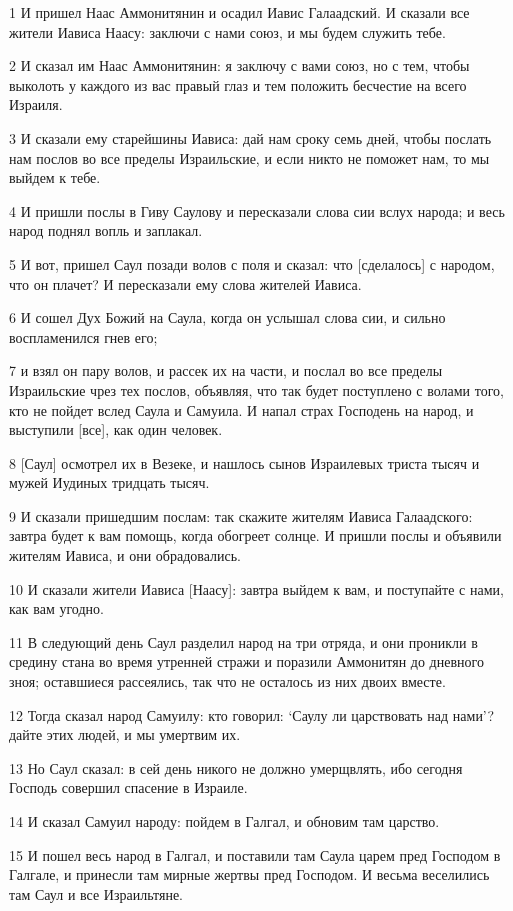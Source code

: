 \par 1 И пришел Наас Аммонитянин и осадил Иавис Галаадский. И сказали все жители Иависа Наасу: заключи с нами союз, и мы будем служить тебе.
\par 2 И сказал им Наас Аммонитянин: я заключу с вами союз, но с тем, чтобы выколоть у каждого из вас правый глаз и тем положить бесчестие на всего Израиля.
\par 3 И сказали ему старейшины Иависа: дай нам сроку семь дней, чтобы послать нам послов во все пределы Израильские, и если никто не поможет нам, то мы выйдем к тебе.
\par 4 И пришли послы в Гиву Саулову и пересказали слова сии вслух народа; и весь народ поднял вопль и заплакал.
\par 5 И вот, пришел Саул позади волов с поля и сказал: что [сделалось] с народом, что он плачет? И пересказали ему слова жителей Иависа.
\par 6 И сошел Дух Божий на Саула, когда он услышал слова сии, и сильно воспламенился гнев его;
\par 7 и взял он пару волов, и рассек их на части, и послал во все пределы Израильские чрез тех послов, объявляя, что так будет поступлено с волами того, кто не пойдет вслед Саула и Самуила. И напал страх Господень на народ, и выступили [все], как один человек.
\par 8 [Саул] осмотрел их в Везеке, и нашлось сынов Израилевых триста тысяч и мужей Иудиных тридцать тысяч.
\par 9 И сказали пришедшим послам: так скажите жителям Иависа Галаадского: завтра будет к вам помощь, когда обогреет солнце. И пришли послы и объявили жителям Иависа, и они обрадовались.
\par 10 И сказали жители Иависа [Наасу]: завтра выйдем к вам, и поступайте с нами, как вам угодно.
\par 11 В следующий день Саул разделил народ на три отряда, и они проникли в средину стана во время утренней стражи и поразили Аммонитян до дневного зноя; оставшиеся рассеялись, так что не осталось из них двоих вместе.
\par 12 Тогда сказал народ Самуилу: кто говорил: `Саулу ли царствовать над нами'? дайте этих людей, и мы умертвим их.
\par 13 Но Саул сказал: в сей день никого не должно умерщвлять, ибо сегодня Господь совершил спасение в Израиле.
\par 14 И сказал Самуил народу: пойдем в Галгал, и обновим там царство.
\par 15 И пошел весь народ в Галгал, и поставили там Саула царем пред Господом в Галгале, и принесли там мирные жертвы пред Господом. И весьма веселились там Саул и все Израильтяне.

